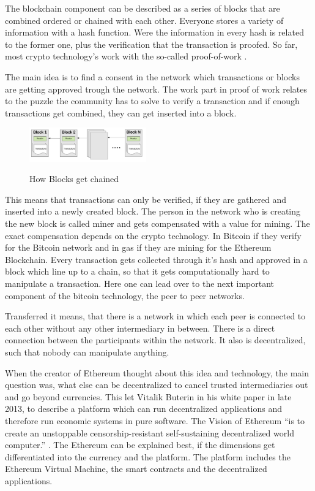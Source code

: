The blockchain component can be described as a series of blocks that are combined ordered or chained with each other. 
Everyone stores a variety of information with a hash function.
Were the information in every hash is related to the former one, plus the verification that the transaction is proofed. 
So far, most crypto technology’s work with the so-called proof-of-work \cite{Ray2018}.

The main idea is to find a consent in the network which transactions or blocks are getting approved trough the network. The work part in proof of work relates to the puzzle the community has to solve to verify a transaction and if enough transactions get combined, they can get inserted into a block.

\begin{figure}[ht]
\centering
\caption{How Blocks get chained} 
\cite{preethi}
\includegraphics[width=0.45\textwidth]{blockchain}
\end{figure}

This means that transactions can only be verified, if they are gathered and inserted into a newly created block. The person in the network who is creating the new block is called miner and gets compensated with a value for mining. 
The exact compensation depends on the crypto technology. 
In Bitcoin if they verify for the Bitcoin network and in gas if they are mining for the Ethereum Blockchain. 
Every transaction gets collected through it's hash and approved in a block which line up to a chain, so that it gets computationally hard to manipulate a transaction. 
Here one can lead over to the next important component of the bitcoin technology, the peer to peer networks. 

Transferred it means, that there is a network in which each peer is connected to each other without any other intermediary in between.
There is a direct connection between the participants within the network. 
It also is decentralized, such that nobody can manipulate anything.

When the creator of Ethereum thought about this idea and technology, the main question was, what else can be decentralized to cancel trusted intermediaries out and go beyond currencies.
This let Vitalik Buterin in his white paper in late 2013, to describe a platform which can run decentralized applications and therefore run economic systems in pure software. 
The Vision of Ethereum “is to create an unstoppable censorship-resistant self-sustaining decentralized world computer.” \cite{Ray2018}.
The Ethereum can be explained best, if the dimensions get differentiated into the currency and the platform. 
The platform includes the Ethereum Virtual Machine, the smart contracts and the decentralized applications. 

